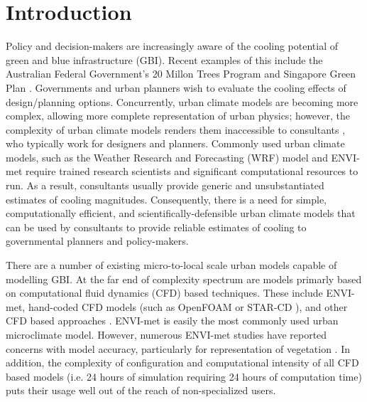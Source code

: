 \documentclass[gmd, manuscript]{copernicus}
\begin{document}




\section{Introduction}\label{sec:introduction}



Policy and decision-makers  are  increasingly aware of the cooling potential of  green and blue infrastructure (GBI). Recent examples of this include the Australian Federal Government's 20 Millon Trees Program \citep{CommonwealthofAustralia2017} and Singapore Green Plan \citep{SMEWR2012}.  Governments and urban planners wish to evaluate the cooling effects of design/planning options. Concurrently, urban climate models are becoming more  complex, allowing more complete representation of  urban physics; however, the complexity of urban climate models renders them inaccessible to consultants \citep{Elasson2000}, who typically work for designers and planners. Commonly used urban climate models, such as the Weather Research and Forecasting (WRF) model 
\citep{Skamarock2008} and ENVI-met \citep{Bruse1999} require trained research scientists and significant computational resources to run. As a result, consultants usually provide generic and unsubstantiated estimates of cooling magnitudes. Consequently, there is a need for simple, computationally efficient, and  scientifically-defensible urban climate models that can be used by consultants to provide reliable estimates of cooling to governmental planners and policy-makers. 

There are a number of existing micro-to-local scale urban models capable of modelling GBI. At the far end of complexity spectrum are models primarly based on computational fluid dynamics (CFD) based techniques. These include ENVI-met, hand-coded  CFD models (such as OpenFOAM \citep{OpenFOAM2011} or STAR-CD \citep{CDadapco2011}), and other CFD based approaches \citep{Bailey2014,Bailey2016,Kunz2000,Schlunzen2011a,Yamada2011,Bruse1999}. ENVI-met is easily the most commonly used urban microclimate model. However, numerous  ENVI-met studies have reported concerns with  model accuracy, particularly for representation of vegetation  \citep{Ali-Toudert2006b,Kruger2011,Acero2015,Spangenberg2008}. In addition, the complexity of configuration and computational intensity of all CFD based models (i.e. 24 hours of simulation requiring 24 hours of computation time) puts their usage well out of the reach of non-specialized users. 
\end{document}
